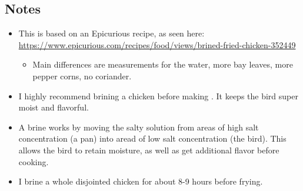 \begin{multicols}{2}
\subsection*{Notes}
\begin{itemize}
    \item This is based on an Epicurious recipe, as seen here: \url{https://www.epicurious.com/recipes/food/views/brined-fried-chicken-352449}
    \begin{itemize}
        \item Main differences are measurements for the water, more bay leaves, more pepper corns, no coriander.
    \end{itemize}
    \item I highly recommend brining a chicken before making . It keeps the bird super moist and flavorful.
    \item A brine works by moving the salty solution from areas of high salt concentration (a pan) into aread of low salt concentration (the bird). This allows the bird to retain moisture, as well as get additional flavor before cooking.
    \item I brine a whole disjointed chicken for about 8-9 hours before frying.
\end{itemize}
\end{multicols}
\clearpage